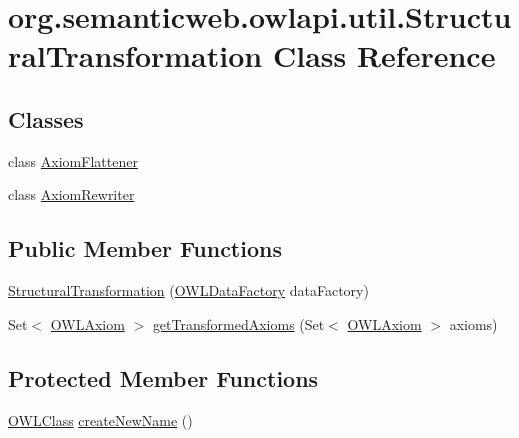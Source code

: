 \hypertarget{classorg_1_1semanticweb_1_1owlapi_1_1util_1_1_structural_transformation}{\section{org.\-semanticweb.\-owlapi.\-util.\-Structural\-Transformation Class Reference}
\label{classorg_1_1semanticweb_1_1owlapi_1_1util_1_1_structural_transformation}
}
\subsection*{Classes}
\begin{DoxyCompactItemize}
\item 
class \hyperlink{classorg_1_1semanticweb_1_1owlapi_1_1util_1_1_structural_transformation_1_1_axiom_flattener}{Axiom\-Flattener}
\item 
class \hyperlink{classorg_1_1semanticweb_1_1owlapi_1_1util_1_1_structural_transformation_1_1_axiom_rewriter}{Axiom\-Rewriter}
\end{DoxyCompactItemize}
\subsection*{Public Member Functions}
\begin{DoxyCompactItemize}
\item 
\hyperlink{classorg_1_1semanticweb_1_1owlapi_1_1util_1_1_structural_transformation_a6594aee466c53f2ab2b5001b226b468e}{Structural\-Transformation} (\hyperlink{interfaceorg_1_1semanticweb_1_1owlapi_1_1model_1_1_o_w_l_data_factory}{O\-W\-L\-Data\-Factory} data\-Factory)
\item 
Set$<$ \hyperlink{interfaceorg_1_1semanticweb_1_1owlapi_1_1model_1_1_o_w_l_axiom}{O\-W\-L\-Axiom} $>$ \hyperlink{classorg_1_1semanticweb_1_1owlapi_1_1util_1_1_structural_transformation_ae97abcdaae4a2d3289294622918c2d14}{get\-Transformed\-Axioms} (Set$<$ \hyperlink{interfaceorg_1_1semanticweb_1_1owlapi_1_1model_1_1_o_w_l_axiom}{O\-W\-L\-Axiom} $>$ axioms)
\end{DoxyCompactItemize}
\subsection*{Protected Member Functions}
\begin{DoxyCompactItemize}
\item 
\hyperlink{interfaceorg_1_1semanticweb_1_1owlapi_1_1model_1_1_o_w_l_class}{O\-W\-L\-Class} \hyperlink{classorg_1_1semanticweb_1_1owlapi_1_1util_1_1_structural_transformation_a29ee6720de9872dff360426b0955523d}{create\-New\-Name} ()
\end{DoxyCompactItemize}
